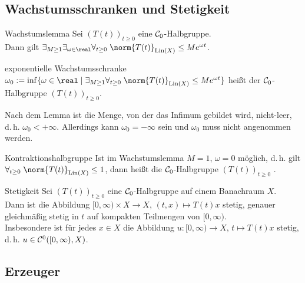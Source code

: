 \subsection{%
    Wachstumsschranken und Stetigkeit%
}

\begin{Lemma}{Wachstumslemma}
    Sei $(T(t))_{t \ge 0}$ eine $\mathcal{C}_0$-Halbgruppe.\\
    Dann gilt $\exists_{M \ge 1} \exists_{\omega \in \real} \forall_{t \ge 0}\;
    \norm{T(t)}_{\Lin(X)} \le Me^{\omega t}$.
\end{Lemma}

\begin{Def}{exponentielle Wachstumsschranke}
    $\omega_0 := \inf\{\omega \in \real \;|\; \exists_{M \ge 1} \forall_{t \ge 0}\;
    \norm{T(t)}_{\Lin(X)} \le Me^{\omega t}\}$ heißt 
    der $\mathcal{C}_0$-Halbgruppe $(T(t))_{t \ge 0}$.
\end{Def}

\begin{Bem}
    Nach dem Lemma ist die Menge, von der das Infimum gebildet wird, nicht-leer,
    d.\,h. $\omega_0 < +\infty$.
    Allerdings kann $\omega_0 = -\infty$ sein und $\omega_0$ muss nicht angenommen werden.
\end{Bem}

\begin{Def}{Kontraktionshalbgruppe}
    Ist im Wachstumslemma $M = 1$, $\omega = 0$ möglich,
    d.\,h. gilt $\forall_{t \ge 0}\; \norm{T(t)}_{\Lin(X)} \le 1$,
    dann heißt die $\mathcal{C}_0$-Halbgruppe $(T(t))_{t \ge 0}$ .
\end{Def}

\linie

\begin{Lemma}{Stetigkeit}
    Sei $(T(t))_{t \ge 0}$ eine $\mathcal{C}_0$-Halbgruppe auf einem Banachraum $X$.\\
    Dann ist die Abbildung $[0, \infty) \times X \to X$, $(t, x) \mapsto T(t) x$
    stetig, genauer gleichmäßig stetig in $t$ auf kompakten Teilmengen von $[0, \infty)$.\\
    Insbesondere ist für jedes $x \in X$ die Abbildung
    $u\colon [0, \infty) \to X$, $t \mapsto T(t) x$ stetig,\\
    d.\,h. $u \in \mathcal{C}^0([0, \infty), X)$.
\end{Lemma}

\pagebreak

\subsection{%
    Erzeuger%
}

